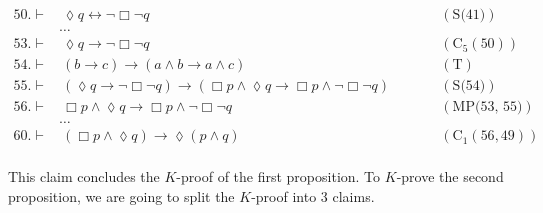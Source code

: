 \documentclass[a4paper, 12pt]{report}
\begin{document}
{{            \begin{equation*}
                \begin{alignedat}{2}
                    50. \vdash & \ \lozenge q \leftrightarrow \lnot \Box \lnot q && \quad \quad (\mbox{S(41)}) \\
                               & \ldots && \\
                    53. \vdash & \ \lozenge q \to \lnot \Box \lnot q && \quad \quad (\mbox{C}_5(50)) \\
                    54. \vdash & \ (b \to c) \to (a \land b \to a \land c) && \quad \quad (\mbox{T}) \\
                    55. \vdash & \ (\lozenge q \to \lnot \Box \lnot q) \to (\Box p \land \lozenge q \to \Box p \land \lnot \Box \lnot q) && \quad \quad (\mbox{S(54)}) \\
                    56. \vdash & \ \Box p \land \lozenge q \to \Box p \land \lnot \Box \lnot q && \quad \quad (\mbox{MP(53, 55)}) \\
                               & \ldots && \\
                    60. \vdash & \ (\Box p \land \lozenge q) \to \lozenge (p \land q) && \quad \quad (\mbox{C}_1(56, 49)) \\
                \end{alignedat}
            \end{equation*}
        }

        This claim concludes the $K$-proof of the first proposition. To $K$-prove the second proposition, we are going to split the $K$-proof into 3 claims.

}
\end{document}
